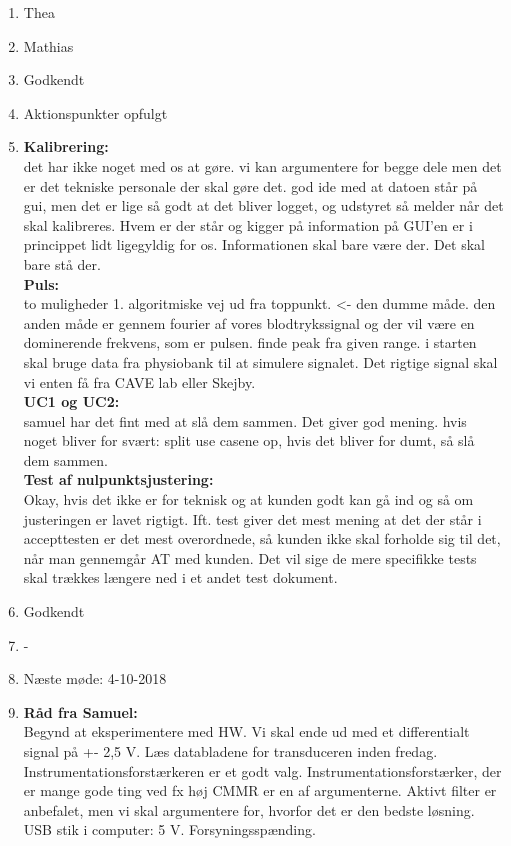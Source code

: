 \begin{enumerate}
	\item Thea
	\item Mathias
	\item Godkendt
	\item Aktionspunkter opfulgt	
	\item \textbf{Kalibrering:} \\ det har ikke noget med os at gøre. vi kan argumentere for begge dele men det er det tekniske personale der skal gøre det. god ide med at datoen står på gui, men det er lige så godt at det bliver logget, og udstyret så melder når det skal kalibreres. Hvem er der står og kigger på information på GUI’en er i princippet lidt ligegyldig for os. Informationen skal bare være der. Det skal bare stå der. \\
	\textbf{Puls:} \\ to muligheder 1. algoritmiske vej ud fra toppunkt. <- den dumme måde. den anden måde er gennem fourier af vores blodtrykssignal og der vil være en dominerende frekvens, som er pulsen. finde peak fra given range. i starten skal bruge data fra physiobank til at simulere signalet. Det rigtige signal skal vi enten få fra CAVE lab eller Skejby.	\\
	\textbf{UC1 og UC2:} \\ samuel har det fint med at slå dem sammen. Det giver god mening. hvis noget bliver for svært: split use casene op, hvis det bliver for dumt, så slå dem sammen. \\
	\textbf{Test af nulpunktsjustering:} \\ Okay, hvis det ikke er for teknisk og at kunden godt kan gå ind og så om justeringen er lavet rigtigt. Ift. test giver det mest mening at det der står i accepttesten er det mest overordnede, så kunden ikke skal forholde sig til det, når man gennemgår AT med kunden. Det vil sige de mere specifikke tests skal trækkes længere ned i et andet test dokument. \\
	\item Godkendt \\
	\item - \\
	\item Næste møde: 4-10-2018 \\ 
	\item \textbf{Råd fra Samuel:} \\ 
	
	Begynd at eksperimentere med HW. Vi skal ende ud med et differentialt signal på +- 2,5 V. Læs databladene for transduceren inden fredag. Instrumentationsforstærkeren er et godt valg. Instrumentationsforstærker, der er mange gode ting ved fx høj CMMR er en af argumenterne. Aktivt filter er anbefalet, men vi skal argumentere for, hvorfor det er den bedste løsning. USB stik i computer: 5 V. Forsyningsspænding. \\
	

\end{enumerate}
